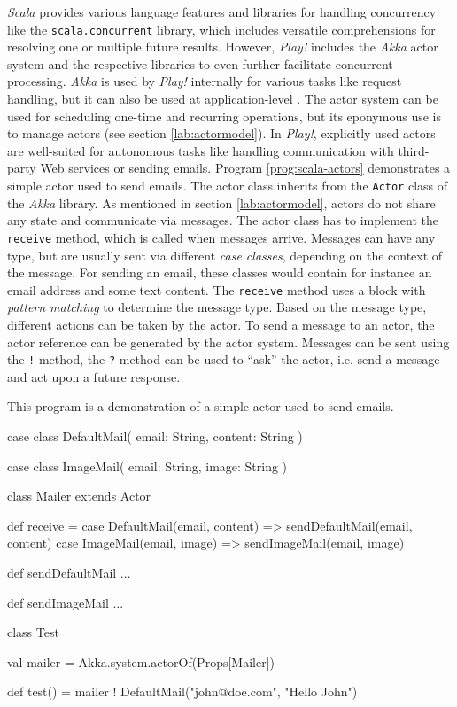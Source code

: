 \textit{Scala} provides various language features and libraries for handling concurrency like the \texttt{scala.concurrent} library, which includes versatile comprehensions for resolving one or multiple future results. However, \textit{Play!} includes the \textit{Akka} actor system and the respective libraries to even further facilitate concurrent processing. \textit{Akka} is used by \textit{Play!} internally for various tasks like request handling, but it can also be used at application-level \cite[p. 83]{Scala}. The actor system can be used for scheduling one-time and recurring operations, but its eponymous use is to manage actors (see section \ref{lab:actormodel}). In \textit{Play!}, explicitly used actors are well-suited for autonomous tasks like handling communication with third-party Web services or sending emails. Program \ref{prog:scala-actors} demonstrates a simple actor used to send emails. The actor class inherits from the \texttt{Actor} class of the \textit{Akka} library. As mentioned in section \ref{lab:actormodel}, actors do not share any state and communicate via messages. The actor class has to implement the \texttt{receive} method, which is called when messages arrive. Messages can have any type, but are usually sent via different \textit{case classes}, depending on the context of the message. For sending an email, these classes would contain for instance an email address and some text content. The \texttt{receive} method uses a block with \textit{pattern matching} to determine the message type. Based on the message type, different actions can be taken by the actor. To send a message to an actor, the actor reference can be generated by the actor system. Messages can be sent using the \texttt{!} method, the \texttt{?} method can be used to ``ask'' the actor, i.e. send a message and act upon a future response.

\begin{program}
  \caption{This program is a demonstration of a simple actor used to send emails.}
  \label{prog:scala-actors}
  \begin{JavaCode}
case class DefaultMail(
    email: String,
    content: String
)

case class ImageMail(
    email: String,
    image: String
)

class Mailer extends Actor {
    
    def receive = {
        case DefaultMail(email, content) =>
            sendDefaultMail(email, content)
        case ImageMail(email, image) =>
            sendImageMail(email, image)
    }

    def sendDefaultMail ...

    def sendImageMail ...

}

class Test {
    
    val mailer = Akka.system.actorOf(Props[Mailer])

    def test() = {
        mailer ! DefaultMail("john@doe.com", "Hello John")
    }

}
  \end{JavaCode}
\end{program}

